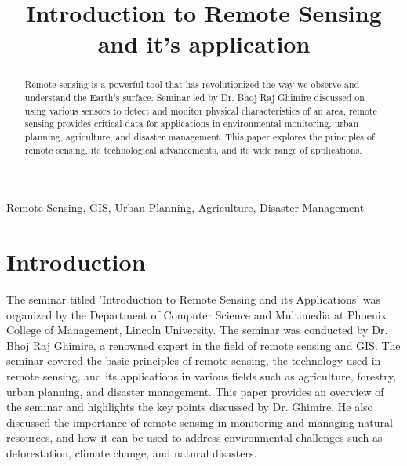 \documentclass[conference]{IEEEtran}
\begin{document}
\title{Introduction to Remote Sensing and it's application}

\author{
}

\maketitle

\begin{abstract}
    Remote sensing is a powerful tool that has revolutionized the way we observe and understand the Earth's surface. Seminar led by Dr. Bhoj Raj Ghimire discussed on using various sensors to detect and monitor physical characteristics of an area, remote sensing provides critical data for applications in environmental monitoring, urban planning, agriculture, and disaster management. This paper explores the principles of remote sensing, its technological advancements, and its wide range of applications.
\end{abstract}

\begin{IEEEkeywords}
    Remote Sensing, GIS, Urban Planning, Agriculture, Disaster Management
\end{IEEEkeywords}

\section{Introduction}
The seminar titled 'Introduction to Remote Sensing and its Applications' was organized by the Department of Computer Science and Multimedia at Phoenix College of Management, Lincoln University. The seminar was conducted by Dr. Bhoj Raj Ghimire, a renowned expert in the field of remote sensing and GIS. The seminar covered the basic principles of remote sensing, the technology used in remote sensing, and its applications in various fields such as agriculture, forestry, urban planning, and disaster management. This paper provides an overview of the seminar and highlights the key points discussed by Dr. Ghimire. He also discussed the importance of remote sensing in monitoring and managing natural resources, and how it can be used to address environmental challenges such as deforestation, climate change, and natural disasters.
\end{document}
